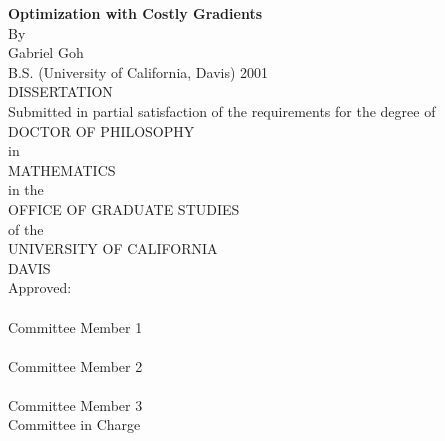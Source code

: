 \begin{center}
   \null\vfill
   \textbf{%
      Optimization with Costly Gradients
   }%
   \\
   \bigskip
   By \\
   \bigskip
   Gabriel Goh \\
   \bigskip
   B.S. (University of California, Davis) 2001 \\
   \bigskip
   DISSERTATION \\
   \bigskip
   Submitted in partial satisfaction of the requirements for the
   degree of \\
   \bigskip
   DOCTOR OF PHILOSOPHY \\
   \bigskip
   in \\
   \bigskip
   MATHEMATICS \\
   \bigskip
   in the \\
   \bigskip
   OFFICE OF GRADUATE STUDIES \\
   \bigskip        
   of the \\
   \bigskip
   UNIVERSITY OF CALIFORNIA \\
   \bigskip
   DAVIS \\
   \bigskip
   Approved: \\
   \bigskip
   \bigskip
   \makebox[3in]{\hrulefill} \\
   Committee Member 1 \\
   \bigskip
   \bigskip
   \makebox[3in]{\hrulefill} \\
   Committee Member 2 \\
   \bigskip
   \bigskip
   \makebox[3in]{\hrulefill} \\
   Committee Member 3 \\
   \bigskip
   Committee in Charge \\
    \\
   \vfill
\end{center}
